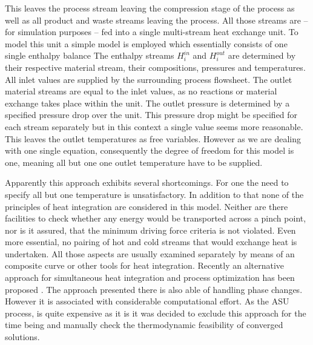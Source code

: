     This leaves the process stream leaving the compression stage of the process as well as all product and waste streams
    leaving the process. All those streams are -- for simulation purposes -- fed into a single multi-stream heat exchange
    unit. To model this unit a simple model is employed which essentially consists of one single enthalpy balance
    The enthalpy streams $H_i^{in}$ and $H_i^{out}$ are determined by their respective material stream, their compositions,
    pressures and temperatures. All inlet values are supplied by the surrounding process flowsheet. The outlet material streams
    are equal to the inlet values, as no reactions or material exchange takes place within the unit. The outlet pressure 
    is determined by a specified pressure drop over the unit. This pressure drop might be specified for each stream separately
    but in this context a single value seems more reasonable. This leaves the outlet temperatures as free variables. However 
    as we are dealing with one single equation, consequently the degree of freedom for this model is one, meaning all but one
    one outlet temperature have to be supplied. 
    
    Apparently this approach exhibits several shortcomings. For one the need to specify all but one temperature is 
    unsatisfactory. In addition to that none of the principles of heat integration are considered in this model. 
    Neither are there facilities to check whether any energy would be transported across a pinch point, nor is
    it assured, that the minimum driving force criteria is not violated. Even more essential, no pairing of 
    hot and cold streams that would exchange heat is undertaken. All those aspects are usually examined separately 
    by means of an composite curve or other tools for heat integration. Recently an alternative approach for
    simultaneous heat integration and process optimization has been proposed \cite{Kamath.2012}. The approach 
    presented there is also able of handling phase changes. However it is associated with considerable computational 
    effort. As the ASU process, is quite expensive as it is it was decided to exclude this approach for the time being 
    and manually check the thermodynamic feasibility of converged solutions. 



